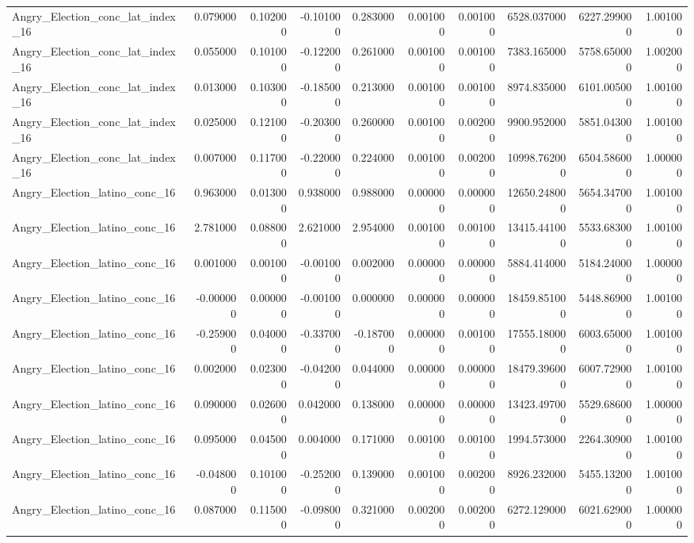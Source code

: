 \begin{table}
\begin{tabular}{lrrrrrrrrr}
Angry_Election_conc_lat_index_16 & 0.079000 & 0.102000 & -0.101000 & 0.283000 & 0.001000 & 0.001000 & 6528.037000 & 6227.299000 & 1.001000 \\
Angry_Election_conc_lat_index_16 & 0.055000 & 0.101000 & -0.122000 & 0.261000 & 0.001000 & 0.001000 & 7383.165000 & 5758.650000 & 1.002000 \\
Angry_Election_conc_lat_index_16 & 0.013000 & 0.103000 & -0.185000 & 0.213000 & 0.001000 & 0.001000 & 8974.835000 & 6101.005000 & 1.001000 \\
Angry_Election_conc_lat_index_16 & 0.025000 & 0.121000 & -0.203000 & 0.260000 & 0.001000 & 0.002000 & 9900.952000 & 5851.043000 & 1.001000 \\
Angry_Election_conc_lat_index_16 & 0.007000 & 0.117000 & -0.220000 & 0.224000 & 0.001000 & 0.002000 & 10998.762000 & 6504.586000 & 1.000000 \\
Angry_Election_latino_conc_16 & 0.963000 & 0.013000 & 0.938000 & 0.988000 & 0.000000 & 0.000000 & 12650.248000 & 5654.347000 & 1.001000 \\
Angry_Election_latino_conc_16 & 2.781000 & 0.088000 & 2.621000 & 2.954000 & 0.001000 & 0.001000 & 13415.441000 & 5533.683000 & 1.001000 \\
Angry_Election_latino_conc_16 & 0.001000 & 0.001000 & -0.001000 & 0.002000 & 0.000000 & 0.000000 & 5884.414000 & 5184.240000 & 1.000000 \\
Angry_Election_latino_conc_16 & -0.000000 & 0.000000 & -0.001000 & 0.000000 & 0.000000 & 0.000000 & 18459.851000 & 5448.869000 & 1.001000 \\
Angry_Election_latino_conc_16 & -0.259000 & 0.040000 & -0.337000 & -0.187000 & 0.000000 & 0.001000 & 17555.180000 & 6003.650000 & 1.001000 \\
Angry_Election_latino_conc_16 & 0.002000 & 0.023000 & -0.042000 & 0.044000 & 0.000000 & 0.000000 & 18479.396000 & 6007.729000 & 1.001000 \\
Angry_Election_latino_conc_16 & 0.090000 & 0.026000 & 0.042000 & 0.138000 & 0.000000 & 0.000000 & 13423.497000 & 5529.686000 & 1.000000 \\
Angry_Election_latino_conc_16 & 0.095000 & 0.045000 & 0.004000 & 0.171000 & 0.001000 & 0.001000 & 1994.573000 & 2264.309000 & 1.001000 \\
Angry_Election_latino_conc_16 & -0.048000 & 0.101000 & -0.252000 & 0.139000 & 0.001000 & 0.002000 & 8926.232000 & 5455.132000 & 1.001000 \\
Angry_Election_latino_conc_16 & 0.087000 & 0.115000 & -0.098000 & 0.321000 & 0.002000 & 0.002000 & 6272.129000 & 6021.629000 & 1.000000 \\

\end{tabular}
\end{table}
